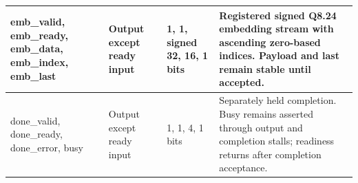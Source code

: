 \documentclass[11pt,a4paper]{article}
\begin{document}
{\begin{longtable}{@{}L{0.21\textwidth}|L{0.12\textwidth}|L{0.12\textwidth}|L{0.45\textwidth}@{}}
emb\_\allowbreak{}valid,\allowbreak{} emb\_\allowbreak{}ready,\allowbreak{} emb\_\allowbreak{}data,\allowbreak{} emb\_\allowbreak{}index,\allowbreak{} emb\_\allowbreak{}last & Output except ready input & 1,\allowbreak{} 1,\allowbreak{} signed 32,\allowbreak{} 16,\allowbreak{} 1 bits & Registered signed Q8.24 embedding stream with ascending zero-based indices. Payload and last remain stable until accepted.\\[2pt]\hline

done\_\allowbreak{}valid,\allowbreak{} done\_\allowbreak{}ready,\allowbreak{} done\_\allowbreak{}error,\allowbreak{} busy & Output except ready input & 1,\allowbreak{} 1,\allowbreak{} 4,\allowbreak{} 1 bits & Separately held completion. Busy remains asserted through output and completion stalls; readiness returns after completion acceptance.\\[2pt]\hline

\bottomrule\end{longtable}}
\end{document}
